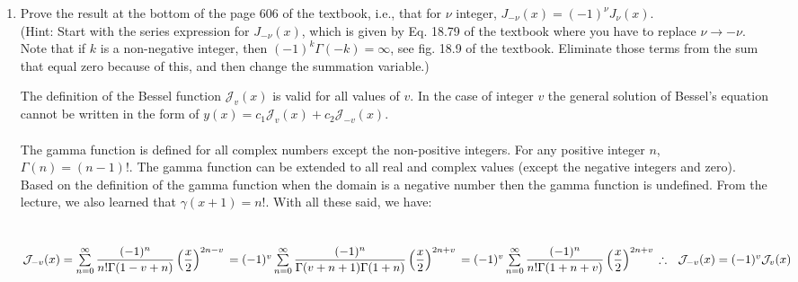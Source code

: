 \documentclass[fleqn]{article}
\begin{document}
\begin{enumerate}
    \item Prove the result at the bottom of the page 606 of the textbook, i.e., that for $\nu$ integer, $J_{-\nu }(x)=(-1)^\nu J_{\nu }(x)$. \\
    (Hint: Start with the series expression for $J_{-\nu }(x)$, which is given by Eq. 18.79 of the textbook where you have to replace $\nu \rightarrow -\nu$. Note that if $k$ is a non-negative integer, then $(-1)^k \Gamma(-k) = \infty$, see fig. 18.9 of the textbook. Eliminate those terms from the sum that equal zero because of this, and then change the summation variable.)
    
      \textcolor{hwColor}{
        The definition of the Bessel function $\mathcal{J}_{v}(x)$ is valid for all values of $v$. In the case of integer $v$ the general 
        solution of Bessel's equation cannot be written in the form of $y(x)=c_1 \mathcal{J}_{v}(x)+c_2 \mathcal{J}_{-v}(x)$. \\
        \\
        The gamma function is defined for all complex numbers except the non-positive integers. For any positive 
        integer $n$, $\Gamma(n)=\left(n-1\right)!$. The gamma function can be extended to all real and complex values 
        (except the negative integers and zero). Based on the definition of the gamma function
        when the domain is a negative number then the gamma function is undefined. From the lecture, we also learned
        that $\gamma(x+1)=n!$. With all these said, we have: \\ 
        \\
        \\
        $
          \mathcal{J}_{-v}(x)=\sum\limits_{n=0}^{\infty} \dfrac{(-1)^n}{n! \Gamma(1-v+n)} \left(\dfrac{x}{2}\right)^{2n-v} \\
          \\
          =(-1)^v \sum\limits_{n=0}^{\infty} \dfrac{(-1)^n}{\Gamma(v+n+1)\Gamma(1+n)} \left(\dfrac{x}{2}\right)^{2n+v} \\
          \\
          =(-1)^v \sum\limits_{n=0}^{\infty} \dfrac{(-1)^n}{n! \Gamma(1+n+v)} \left(\dfrac{x}{2}\right)^{2n+v} \\
          \\
          \therefore ~~ \mathcal{J}_{-v}(x)=(-1)^v \mathcal{J}_{v}(x)
        $
      }

  \end{enumerate}

  \pagebreak
\end{document}
